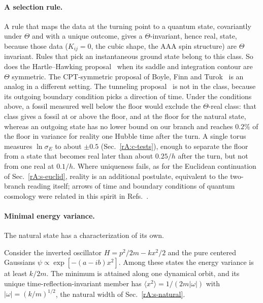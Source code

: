 \paragraph{A selection rule.}
A rule that maps the data at the turning point to a quantum state, covariantly under $\Theta$ and with a unique outcome, gives a $\Theta$-invariant, hence real, state, because those data ($K_{ij}=0$, the cubic shape, the AAA spin structure) are $\Theta$ invariant.
Rules that pick an instantaneous ground state belong to this class.
So does the Hartle--Hawking proposal~\cite{Hartle:1983ai} when its saddle and integration contour are $\Theta$ symmetric.
The CPT-symmetric proposal of Boyle, Finn and Turok~\cite{Boyle:2018tzc} is an analog in a different setting.
The tunneling proposal~\cite{Vilenkin:1984wp} is not in the class, because its outgoing boundary condition picks a direction of time.
Under the conditions above, a fossil measured well below the floor would exclude the $\Theta$-real class: that class gives a fossil at or above the floor, and at the floor for the natural state, whereas an outgoing state has no lower bound on our branch and reaches $0.2\%$ of the floor in variance for reality one Hubble time after the turn. %
A single torus measures $\ln\sigma_E$ to about $\pm0.5$ (Sec.~\ref{rA:c-tests}), enough to separate the floor from a state that becomes real later than about $0.25/h$ after the turn, but not from one real at $0.1/h$. %
Where uniqueness fails, as for the Euclidean continuation of Sec.~\ref{rA:s-euclid}, reality is an additional postulate, equivalent to the two-branch reading itself; arrows of time and boundary conditions of quantum cosmology were related in this spirit in Refs.~\cite{Hawking:1985af,Page:1985ei,Kiefer:1994gp}.

\paragraph{Minimal energy variance.}
The natural state has a characterization of its own.

\begin{rAprop}\label{prop:rA-minvar}
Consider the inverted oscillator $H=p^2/2m-kx^2/2$ and the pure centered Gaussians $\psi\propto\exp[-(a-ib)x^2]$.
Among these states the energy variance is at least $k/2m$.
The minimum is attained along one dynamical orbit, and its unique time-reflection-invariant member has $\langle x^2\rangle=1/(2m|\omega|)$ with $|\omega|=(k/m)^{1/2}$, the natural width of Sec.~\ref{rA:s-natural}.
\end{rAprop}

